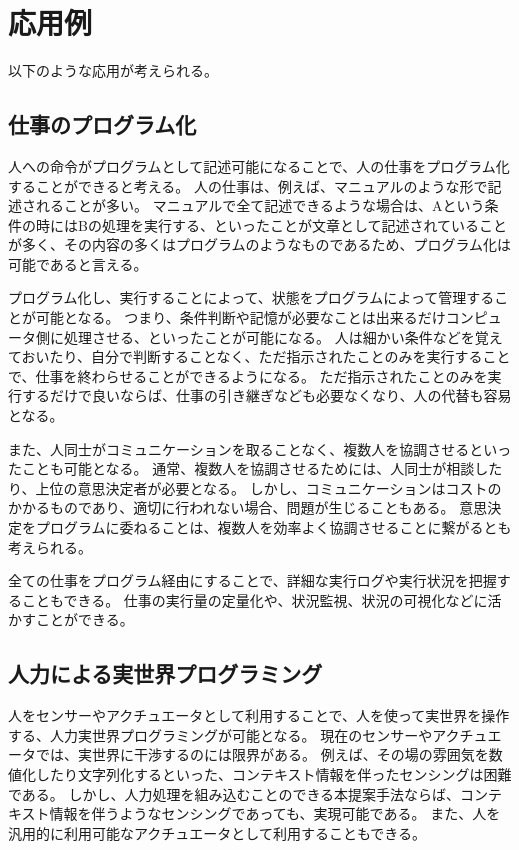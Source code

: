 \documentclass[twoside]{wiss}
\begin{document}
\section{応用例}

以下のような応用が考えられる。

\subsection{仕事のプログラム化}

人への命令がプログラムとして記述可能になることで、人の仕事をプログラム化することができると考える。
人の仕事は、例えば、マニュアルのような形で記述されることが多い。
マニュアルで全て記述できるような場合は、Aという条件の時にはBの処理を実行する、といったことが文章として記述されていることが多く、その内容の多くはプログラムのようなものであるため、プログラム化は可能であると言える。

プログラム化し、実行することによって、状態をプログラムによって管理することが可能となる。
つまり、条件判断や記憶が必要なことは出来るだけコンピュータ側に処理させる、といったことが可能になる。
人は細かい条件などを覚えておいたり、自分で判断することなく、ただ指示されたことのみを実行することで、仕事を終わらせることができるようになる。
ただ指示されたことのみを実行するだけで良いならば、仕事の引き継ぎなども必要なくなり、人の代替も容易となる。

また、人同士がコミュニケーションを取ることなく、複数人を協調させるといったことも可能となる。
通常、複数人を協調させるためには、人同士が相談したり、上位の意思決定者が必要となる。
しかし、コミュニケーションはコストのかかるものであり、適切に行われない場合、問題が生じることもある。
意思決定をプログラムに委ねることは、複数人を効率よく協調させることに繋がるとも考えられる。

全ての仕事をプログラム経由にすることで、詳細な実行ログや実行状況を把握することもできる。
仕事の実行量の定量化や、状況監視、状況の可視化などに活かすことができる。


\subsection{人力による実世界プログラミング}

人をセンサーやアクチュエータとして利用することで、人を使って実世界を操作する、人力実世界プログラミングが可能となる。
現在のセンサーやアクチュエータでは、実世界に干渉するのには限界がある。
例えば、その場の雰囲気を数値化したり文字列化するといった、コンテキスト情報を伴ったセンシングは困難である。
しかし、人力処理を組み込むことのできる本提案手法ならば、コンテキスト情報を伴うようなセンシングであっても、実現可能である。
また、人を汎用的に利用可能なアクチュエータとして利用することもできる。
\end{document}
